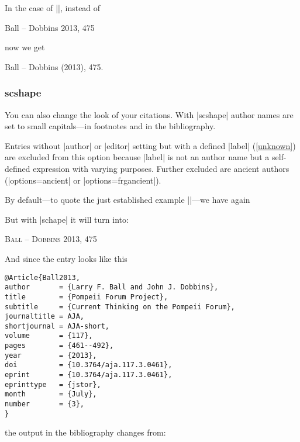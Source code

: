 \documentclass[a4paper,
10pt,
greek,
french,
spanish,
italian,
ngerman,
english
]{ltxdoc}
\begin{document}
In the case of |\cite[475]{Ball2013}|, instead of
\begin{bsp} 
Ball – Dobbins 2013, 475 
\end{bsp}

now we get

\begin{bsp}
Ball – Dobbins {\color{red}(}2013{\color{red})}, 475.
\end{bsp}


\subsubsection{scshape}\label{scshape}
You can also change the look of your citations. 
With |scshape| author names are set to small capitals---in footnotes and in the bibliography.

Entries without |author| or |editor| setting but with a defined
 |label| (\cref{unknown}) are excluded from this option
because |label| is not an author name but a self-defined expression with varying purposes.
Further excluded are ancient authors (|options={ancient}| or |options={frgancient}|).

By default---to quote the just established example |\cite[475]{Ball2013}|---we have again

\begin{bsp} \cite[475]{Ball2013} \end{bsp}

But with |schape| it will turn into:

\begin{bsp}
{\scshape {\color{red}Ball – Dobbins}} 2013, 475
\end{bsp}

And since the entry looks like this

\begin{lstlisting}[style=bibentry,label=Ball2013,caption={{@}Article\{Ball2013,…\} }]
@Article{Ball2013,
author       = {Larry F. Ball and John J. Dobbins},
title        = {Pompeii Forum Project},
subtitle     = {Current Thinking on the Pompeii Forum},
journaltitle = AJA,
shortjournal = AJA-short,
volume       = {117},
pages        = {461--492},
year         = {2013},
doi          = {10.3764/aja.117.3.0461},
eprint       = {10.3764/aja.117.3.0461},
eprinttype   = {jstor},
month        = {July},
number       = {3},
}
\end{lstlisting}


the output in the bibliography changes from:
\end{document}
